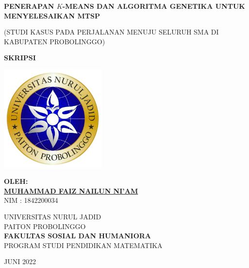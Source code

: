 \begin{titlepage}
   \begin{center}

       \textbf{PENERAPAN $K$-MEANS DAN ALGORITMA GENETIKA UNTUK MENYELESAIKAN MTSP}
       
       (STUDI KASUS PADA PERJALANAN MENUJU SELURUH SMA DI KABUPATEN PROBOLINGGO)

       \vfill
       \textbf{SKRIPSI}
       \vfill
       
       \includegraphics[width=0.4\textwidth]{logo.png}
       
       \vfill
       
       \textbf{OLEH:}\\
       \textbf{\underline{MUHAMMAD FAIZ NAILUN NI'AM}}\\
       NIM : 1842200034

       \vfill
       
       UNIVERSITAS NURUL JADID\\
       PAITON PROBOLINGGO\\
       \textbf{FAKULTAS SOSIAL DAN HUMANIORA}\\       
       PROGRAM STUDI PENDIDIKAN MATEMATIKA\\
       
       \vfill       
       
       JUNI 2022
       
   \end{center}
\end{titlepage}